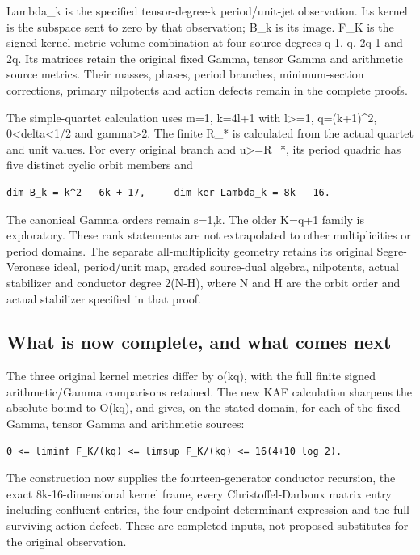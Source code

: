 \documentclass[
]{article}
\begin{document}
Lambda\_k is the specified tensor-degree-k period/unit-jet observation.
Its kernel is the subspace sent to zero by that observation; B\_k is its
image. F\_K is the signed kernel metric-volume combination at four
source degrees q-1, q, 2q-1 and 2q. Its matrices retain the original
fixed Gamma, tensor Gamma and arithmetic source metrics. Their masses,
phases, period branches, minimum-section corrections, primary nilpotents
and action defects remain in the complete proofs.

The simple-quartet calculation uses m=1, k=4l+1 with l\textgreater=1,
q=(k+1)\^{}2, 0\textless delta\textless1/2 and gamma\textgreater2. The
finite R\_* is calculated from the actual quartet and unit values. For
every original branch and \textbar u\textbar\textgreater=R\_*, its
period quadric has five distinct cyclic orbit members and

\begin{verbatim}
dim B_k = k^2 - 6k + 17,     dim ker Lambda_k = 8k - 16.
\end{verbatim}

The canonical Gamma orders remain s=1,k. The older K=q+1 family is
exploratory. These rank statements are not extrapolated to other
multiplicities or period domains. The separate all-multiplicity geometry
retains its original Segre-Veronese ideal, period/unit map, graded
source-dual algebra, nilpotents, actual stabilizer and conductor degree
2(N-\textbar H\textbar), where N and H are the orbit order and actual
stabilizer specified in that proof.

\subsection{What is now complete, and what comes
next}\label{what-is-now-complete-and-what-comes-next}

The three original kernel metrics differ by o(kq), with the full finite
signed arithmetic/Gamma comparisons retained. The new KAF calculation
sharpens the absolute bound to O(kq), and gives, on the stated domain,
for each of the fixed Gamma, tensor Gamma and arithmetic sources:

\begin{verbatim}
0 <= liminf F_K/(kq) <= limsup F_K/(kq) <= 16(4+10 log 2).
\end{verbatim}

The construction now supplies the fourteen-generator conductor
recursion, the exact 8k-16-dimensional kernel frame, every
Christoffel-Darboux matrix entry including confluent entries, the four
endpoint determinant expression and the full surviving action defect.
These are completed inputs, not proposed substitutes for the original
observation.
\end{document}
